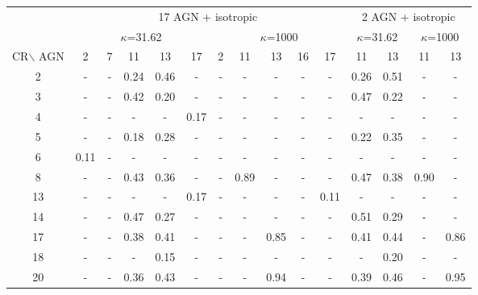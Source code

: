 
\begin{sidewaystable}
\begin{center}
\begin{tabular}{|c|c|c|c|c|c|c|c|c|c|c|c|c|c|c|}

  \hline
  & \multicolumn{10}{|c|}{17 AGN + isotropic} & \multicolumn{4}{|c|}{2 AGN + isotropic} \\
  \cline{2-15}
  & \multicolumn{5}{|c|}{$\kappa$=31.62} & \multicolumn{5}{|c|}{$\kappa$=1000}& \multicolumn{2}{|c|}{$\kappa$=31.62} & \multicolumn{2}{|c|}{$\kappa$=1000} \\
   \cline{2-15}
  CR$\backslash$ AGN &
        2  &   7  &  11  &  13  &  17  &   2   &   11   &   13   &   16  &   17  &   11  &   13  &   11   &   13  \\
  \hline
  2 &   -  &   -  & 0.24 & 0.46 &   -  &   -   &   -    &    -   &   -    &   -    & 0.26  & 0.51  &   -    &   -   \\
  3 &   -  &   -  & 0.42 & 0.20 &   -  &   -   &   -    &    -   &   -    &   -    & 0.47  & 0.22  &   -    &   -   \\
  4 &   -  &   -  &   -  &    - & 0.17 &   -   &   -    &    -   &   -    &   -    &   -   &    -  &   -    &   -   \\
  5 &   -  &   -  & 0.18 & 0.28 &   -  &   -   &   -    &    -   &   -    &   -    & 0.22  & 0.35  &   -    &   -   \\
  6 & 0.11 &   -  &   -  &   -  &   -  &   -   &   -    &    -   &   -    &   -    &   -   &   -   &   -    &   -   \\
  8 &   -  &   -  & 0.43 & 0.36 &   -  &   -   & 0.89   &    -   &   -    &   -    & 0.47  & 0.38  & 0.90   &   -   \\
 13 &   -  &   -  &   -  &   -  & 0.17 &   -   &   -    &   -    &   -    & 0.11   &   -   &   -   &   -    &   -   \\
 14 &   -  &   -  & 0.47 & 0.27 &   -  &   -   &   -    &   -    &   -    &   -    & 0.51  & 0.29  &   -    &   -   \\
 \hline
 17 &   -  &   -  & 0.38 & 0.41 &   -  &   -   &   -    & 0.85   &   -    &   -    & 0.41  & 0.44  &   -    & 0.86  \\
 18 &   -  &   -  &   -  & 0.15 &   -  &   -   &   -    &   -    &   -    &   -    &   -   & 0.20  &   -    &   -   \\
 20 &   -  &   -  & 0.36 & 0.43 &   -  &   -   &   -    & 0.94   &   -    &   -    & 0.39  & 0.46  &   -    & 0.95  \\

\end{tabular}
\end{center}
\end{sidewaystable}
